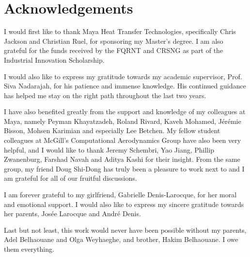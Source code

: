 \chapter*{Acknowledgements}
I would first like to thank Maya Heat Transfer Technologies, specifically Chris Jackson and Christian Ruel, for sponsoring my Master's degree. I am also grateful for the funds received by the FQRNT and CRSNG as part of the Industrial Innovation Scholarship.

I would also like to express my gratitude towards my academic supervisor, Prof. Siva Nadarajah, for his patience and immense knowledge. His continued guidance has helped me stay on the right path throughout the last two years.

I have also benefited greatly from the support and knowledge of my colleagues at Maya, namely Peyman Khayatzadeh, Roland Rivard, Kaveh Mohamed, Jérémie Bisson, Mohsen Karimian and especially Lee Betchen. My fellow student colleagues at McGill's Computational Aerodynamics Group have also been very helpful, and I would like to thank Jeremy Schembri, Yao Jiang, Phillip Zwanenburg, Farshad Navah and Aditya Kashi for their insight. From the same group, my friend Doug Shi-Dong has truly been a pleasure to work next to and I am grateful for all of our fruitful discussions.

I am forever grateful to my girlfriend, Gabrielle Denis-Larocque, for her moral and emotional support. I would also like to express my sincere gratitude towards her parents, Josée Larocque and André Denis.

Last but not least, this work would never have been possible without my parents, Adel Belhaouane and Olga Weyhaeghe, and brother, Hakim Belhaouane. I owe them everything.
